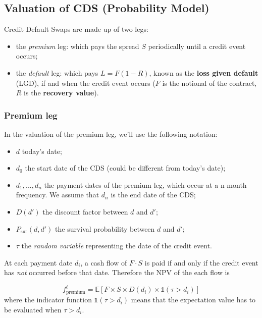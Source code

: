 \subsection{Valuation of CDS (Probability Model)}
\label{sec:cds_valuation}

Credit Default Swaps are made up of two legs:

\begin{itemize}
\tightlist
\item
  the \emph{premium} leg: which pays the spread \(S\) periodically until a credit event occurs;
\item
  the \emph{default} leg: which pays \(L = F(1 - R)\), known as the
  \textbf{loss given default} (LGD), if and when the credit event occurs ($F$ is the notional of the contract, $R$ is the \textbf{recovery value}).
\end{itemize}

\subsubsection{Premium leg}\label{premium-leg}

In the valuation of the premium leg, we'll use the following notation:

\begin{itemize}
\tightlist
\item
  \(d\) today's date;
\item
  \(d_0\) the start date of the CDS (could be different from today's date);
\item
  \(d_1, ..., d_n\) the payment dates of the premium leg, which occur at
  a n-month frequency. We assume that \(d_n\) is the end date of the CDS;
\item
  \(D(d')\) the discount factor between \(d\) and \(d'\);
\item
  $P_{\textrm{sur}}(d, d')$ the survival probability between \(d\) and \(d'\);
\item
  \(\tau\) the \emph{random variable} representing the date of the credit event.
\end{itemize}

At each payment date \(d_i\), a cash flow of \(F\cdot S\) is paid if and only if the credit event has \emph{not} occurred before that date. Therefore the NPV of the each flow is

\begin{equation}
f_{\textrm{premium}}^i = \mathbb{E}\left[F\times S \times D(d_i) \times \mathbb{1}(\tau > d_i) \right]
\end{equation}
where the indicator function \(\mathbb{1}(\tau > d_i)\) means that the expectation value has to be evaluated when \(\tau > d_i\). 

